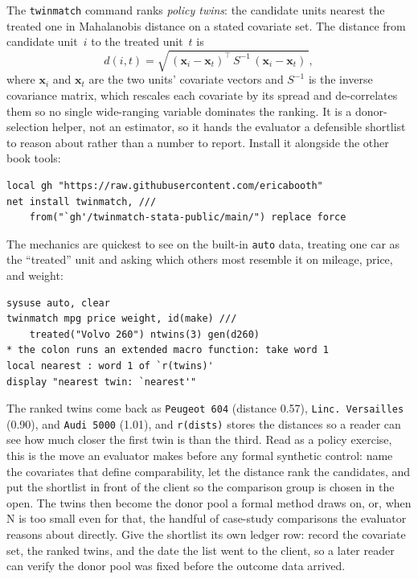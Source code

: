 The \texttt{twinmatch} command ranks \emph{policy twins}: the candidate units nearest the treated one in Mahalanobis distance on a stated covariate set. The distance from candidate unit~$i$ to the treated unit~$t$ is
\[
d(i,t)=\sqrt{\,(\mathbf{x}_i-\mathbf{x}_t)^{\!\top}\,S^{-1}\,(\mathbf{x}_i-\mathbf{x}_t)\,},
\]
where $\mathbf{x}_i$ and $\mathbf{x}_t$ are the two units' covariate vectors and $S^{-1}$ is the inverse covariance matrix, which rescales each covariate by its spread and de-correlates them so no single wide-ranging variable dominates the ranking. It is a donor-selection helper, not an estimator, so it hands the evaluator a defensible shortlist to reason about rather than a number to report. Install it alongside the other book tools:
\par
{\footnotesize
\begin{verbatim}
local gh "https://raw.githubusercontent.com/ericabooth"
net install twinmatch, ///
    from("`gh'/twinmatch-stata-public/main/") replace force
\end{verbatim}
}
The mechanics are quickest to see on the built-in \texttt{auto} data, treating one car as the \enquote{treated} unit and asking which others most resemble it on mileage, price, and weight:
\par
{\footnotesize
\begin{verbatim}
sysuse auto, clear
twinmatch mpg price weight, id(make) ///
    treated("Volvo 260") ntwins(3) gen(d260)
* the colon runs an extended macro function: take word 1
local nearest : word 1 of `r(twins)'
display "nearest twin: `nearest'"
\end{verbatim}
}
The ranked twins come back as \texttt{Peugeot 604} (distance 0.57), \texttt{Linc.\ Versailles} (0.90), and \texttt{Audi 5000} (1.01), and \texttt{r(dists)} stores the distances so a reader can see how much closer the first twin is than the third. Read as a policy exercise, this is the move an evaluator makes before any formal synthetic control: name the covariates that define comparability, let the distance rank the candidates, and put the shortlist in front of the client so the comparison group is chosen in the open. The twins then become the donor pool a formal method draws on, or, when N is too small even for that, the handful of case-study comparisons the evaluator reasons about directly. Give the shortlist its own ledger row: record the covariate set, the ranked twins, and the date the list went to the client, so a later reader can verify the donor pool was fixed before the outcome data arrived.

